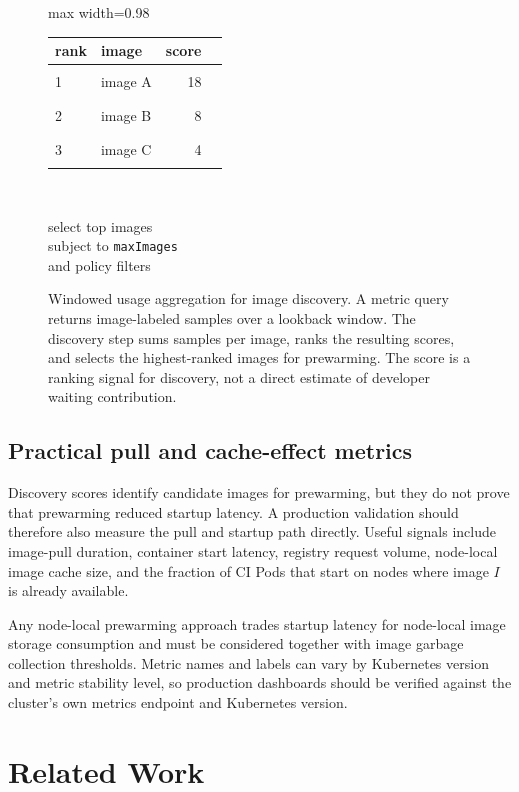 \documentclass[11pt,a4paper]{article}
\begin{document}
\begin{figure}[H]
\begin{adjustbox}{max width=0.98\linewidth}
\begin{minipage}[t]{0.34\linewidth}
\begin{tabular}{llrl}
\toprule
rank & image & score & \\
\midrule
1 & image A & 18 & \rule{1.3cm}{0.7ex} \\
2 & image B & 8 & \rule{0.65cm}{0.7ex} \\
3 & image C & 4 & \rule{0.35cm}{0.7ex} \\
\bottomrule
\end{tabular}
\\[0.4em]
\footnotesize\raggedright select top images\\subject to \texttt{maxImages}\\and policy filters
\end{minipage}
\end{adjustbox}
\caption{Windowed usage aggregation for image discovery. A metric query returns image-labeled samples over a lookback window. The discovery step sums samples per image, ranks the resulting scores, and selects the highest-ranked images for prewarming. The score is a ranking signal for discovery, not a direct estimate of developer waiting contribution.}
\label{fig:usage-window-aggregation}
\end{figure}


\subsection{Practical pull and cache-effect metrics}

Discovery scores identify candidate images for prewarming, but they do not prove that prewarming reduced startup latency. A production validation should therefore also measure the pull and startup path directly. Useful signals include image-pull duration, container start latency, registry request volume, node-local image cache size, and the fraction of CI Pods that start on nodes where image \(I\) is already available.

Any node-local prewarming approach trades startup latency for node-local image storage consumption and must be considered together with image garbage collection thresholds. Metric names and labels can vary by Kubernetes version and metric stability level, so production dashboards should be verified against the cluster's own metrics endpoint and Kubernetes version.


\section{Related Work}
\end{document}
